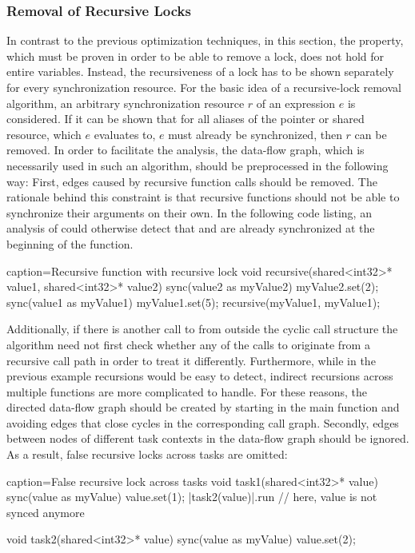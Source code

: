 \subsubsection{Removal of Recursive Locks}
In contrast to the previous optimization techniques, in this section, the property, which must be proven in order to be able to remove a lock, does not hold for entire variables. Instead, the recursiveness of a lock has to be shown separately for every synchronization resource. For the basic idea of a recursive-lock removal algorithm, an arbitrary synchronization resource $r$ of an expression $e$ is considered. If it can be shown that for all aliases of the pointer or shared resource, which $e$ evaluates to, $e$ must already be synchronized, then $r$ can be removed. In order to facilitate the analysis, the data-flow graph, which is necessarily used in such an algorithm, should be preprocessed in the following way: First, edges caused by recursive function calls should be removed. The rationale behind this constraint is that recursive functions should not be able to synchronize their arguments on their own. In the following code listing, an analysis of  could otherwise  detect that  and  are already synchronized at the beginning of the function.

\begin{ccode}{caption=Recursive function with recursive lock}
void recursive(shared<int32>* value1, shared<int32>* value2) {
  sync(value2 as myValue2) {
    myValue2.set(2);
  }
  sync(value1 as myValue1) {
    myValue1.set(5);
    recursive(myValue1, myValue1);
  }
}
\end{ccode}

Additionally, if there is another call to  from outside the cyclic call structure the algorithm need not first check whether any of the calls to  originate from a recursive call path in order to treat it differently. Furthermore, while in the previous example recursions would be easy to detect, indirect recursions across multiple functions are more complicated to handle. For these reasons, the directed data-flow graph should be created by starting in the main function and avoiding edges that close cycles in the corresponding call graph. Secondly, edges between nodes of different task contexts in the data-flow graph should be ignored. As a result, false recursive locks across tasks are omitted:

\begin{ccode}{caption=False recursive lock across tasks}
void task1(shared<int32>* value) {
  sync(value as myValue) { value.set(1); 
    |task2(value)|.run                   // here, value is not synced anymore
  }
}

void task2(shared<int32>* value) {
  sync(value as myValue) { value.set(2); }
}
\end{ccode}

